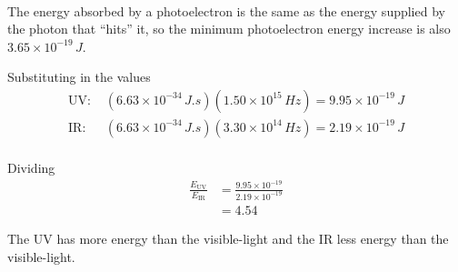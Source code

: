 \begin{solutions}
\begin{enum-alph}
\begin{align*}
            \end{align*}
        \item The energy absorbed by a photoelectron is the same as the energy supplied by
            the photon that ``hits'' it, so the minimum photoelectron energy increase is also
            $3.65\times10^{-19}\,\si{J}$.
        \end{enum-alph}
    \item 
        \begin{enum-alph}
            \item Substituting in the values
                \begin{align*}
                    \text{UV: }&(6.63\times10^{-34}\,\si{J.s})(1.50\times10^{15}\,\si{Hz})=9.95\times10^{-19}\,\si{J}\\
                    \text{IR: }&(6.63\times10^{-34}\,\si{J.s})(3.30\times10^{14}\,\si{Hz})=2.19\times10^{-19}\,\si{J}\\
                \end{align*}
            \item Dividing
                \begin{align*}
                    \frac{E_\text{UV}}{E_\text{IR}}&=\frac{9.95\times10^{-19}}{2.19\times10^{-19}}\\
                                                   &=4.54
                \end{align*}
            \item The UV has more energy than the visible-light and the IR less energy than
                the visible-light.
        \end{enum-alph}
\end{solutions}
